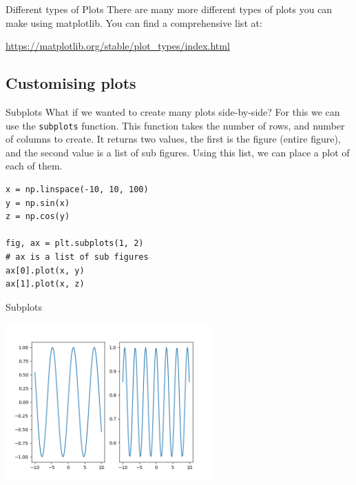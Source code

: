 \documentclass[10pt]{beamer}
\begin{document}
\begin{frame}[label={sec:orgd75a4c4}]{Different types of Plots}
There are many more different types of plots you can make using matplotlib. You
can find a comprehensive list at:

\url{https://matplotlib.org/stable/plot\_types/index.html}
\end{frame}

\subsection{Customising plots}
\label{sec:orgffca673}

\begin{frame}[label={sec:org90bb70d},fragile]{Subplots}
 What if we wanted to create many plots side-by-side? For this we can use the
\texttt{subplots} function. This function takes the number of rows, and number of columns
to create. It returns two values, the first is the figure (entire figure), and
the second value is a list of sub figures. Using this list, we can place a plot
of each of them.

\begin{verbatim}
x = np.linspace(-10, 10, 100)
y = np.sin(x)
z = np.cos(y)

fig, ax = plt.subplots(1, 2)
# ax is a list of sub figures
ax[0].plot(x, y)
ax[1].plot(x, z)
\end{verbatim}
\end{frame}

\begin{frame}[label={sec:orgadea7db}]{Subplots}
\begin{center}
\includegraphics[width=0.6\textwidth]{images/subplots.png}
\end{center}
\end{frame}
\end{document}

